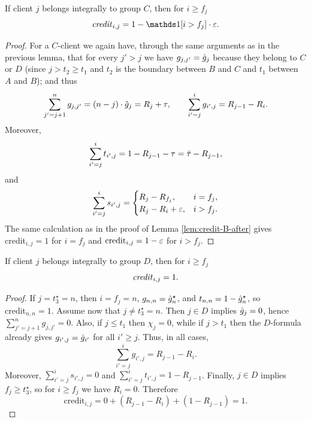 \begin{lemma}
\label{lem:credit-C-after}
    If client $j$ belongs integrally to group $C$, then for $i \geq f_j$
    \begin{equation*}
        \text{\emph{credit}}_{i,j} = 1 - \ind[i > f_j] \cdot \Mcoeffmone.
    \end{equation*}
\end{lemma}
\begin{proof}
    For a $C$-client we again have, through the same arguments as in the previous lemma, that for every $j' > j$ we have $g_{j,j'} = \hat{g}_j$ because they belong to $C$ or $D$ (since $j>t_2\geq t_1$ and $t_2$ is the boundary between $B$ and $C$ and $t_1$ between $A$ and $B$); and thus
    \begin{equation*}
        \sum_{j'=j+1}^n g_{j,j'} = (n-j) \cdot \hat{g}_j = R_j + \tau,
        \qquad
        \sum_{i'=j}^{i} g_{i',j} = R_{j-1}-R_i.
    \end{equation*}
    Moreover,
    \begin{equation*}
        \sum_{i'=j}^{i} t_{i',j} = 1-R_{j-1}-\tau = \bar\tau-R_{j-1},
    \end{equation*}
    and
    \begin{equation*}
        \sum_{i'=j}^{i} s_{i',j} =
        \begin{cases}
            R_j-R_{f_j}, & i=f_j,\\
            R_j-R_i+\varepsilon, & i>f_j.
        \end{cases}
    \end{equation*}
    The same calculation as in the proof of Lemma \ref{lem:credit-B-after} gives $\text{credit}_{i,j}=1$ for $i=f_j$ and $\text{credit}_{i,j}=1-\varepsilon$ for $i>f_j$.
\end{proof}

\begin{lemma}
    \label{lem:credit-D-after}
    If client $j$ belongs integrally to group $D$, then for $i \geq f_j$
    \begin{equation*}
        \text{\emph{credit}}_{i,j} = 1.
    \end{equation*}
\end{lemma}
\begin{proof}
    If $j=t_3^\star=n$, then $i=f_j=n$, $g_{n,n}=\hat{g}_n^\star$, and $t_{n,n}=1-\hat{g}_n^\star$, so $\text{credit}_{n,n}=1$.
    Assume now that $j \neq t_3^\star=n$.
    Then $j \in D$ implies $\hat{g}_j=0$, hence $\sum_{j'=j+1}^n g_{j,j'}=0$.
    Also, if $j \le t_1$ then $\chi_j=0$, while if $j>t_1$ then the $D$-formula already gives $g_{i',j}=\hat{g}_{i'}$ for all $i' \ge j$.
    Thus, in all cases,
    \begin{equation*}
        \sum_{i'=j}^{i} g_{i',j} = R_{j-1}-R_i.
    \end{equation*}
    Moreover, $\sum_{i'=j}^{i} s_{i',j}=0$ and $\sum_{i'=j}^{i} t_{i',j}=1-R_{j-1}$.
    Finally, $j \in D$ implies $f_j \ge t_3^\star$, so for $i \ge f_j$ we have $R_i=0$.
    Therefore
    \begin{equation*}
        \text{credit}_{i,j} = 0 + (R_{j-1}-R_i) + (1-R_{j-1}) = 1.
    \end{equation*}
\end{proof}

